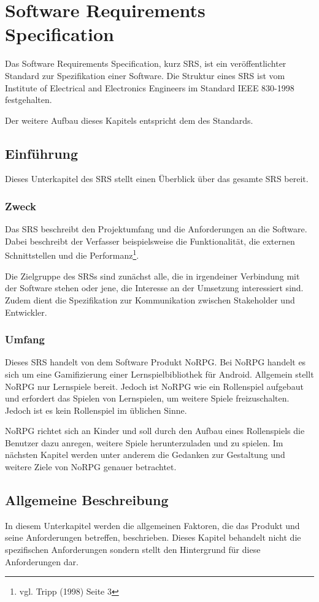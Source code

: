 \chapter{Software Requirements Specification}
	Das Software Requirements Specification, kurz SRS, ist ein veröffentlichter Standard zur Spezifikation einer Software. Die Struktur eines SRS ist vom Institute of Electrical and Electronics Engineers im Standard IEEE 830-1998 festgehalten.
	
	Der weitere Aufbau dieses Kapitels entspricht dem des Standards.
	
\section{Einführung}
	Dieses Unterkapitel des SRS stellt einen Überblick über das gesamte SRS bereit.
	
	\subsection{Zweck}
		Das SRS beschreibt den Projektumfang und die Anforderungen an die Software. Dabei beschreibt der Verfasser beispielsweise die Funktionalität, die externen Schnittstellen und die Performanz\footnote{vgl. Tripp \cite{srsIEEE}(1998) Seite 3}. 
	
		Die Zielgruppe des SRSs sind zunächst alle, die in irgendeiner Verbindung mit der Software stehen oder jene, die Interesse an der Umsetzung interessiert sind. Zudem dient die Spezifikation zur Kommunikation zwischen Stakeholder und Entwickler.
		
	\subsection{Umfang}
		Dieses SRS handelt von dem Software Produkt NoRPG. Bei NoRPG handelt es sich um eine Gamifizierung einer Lernspielbibliothek für Android. Allgemein stellt NoRPG nur Lernspiele bereit. Jedoch ist NoRPG wie ein Rollenspiel aufgebaut und erfordert das Spielen von Lernspielen, um weitere Spiele freizuschalten. Jedoch ist es kein Rollenspiel im üblichen Sinne.
		
		NoRPG richtet sich an Kinder und soll durch den Aufbau eines Rollenspiels die Benutzer dazu anregen, weitere Spiele herunterzuladen und zu spielen. Im nächsten Kapitel werden unter anderem die Gedanken zur Gestaltung und weitere Ziele von NoRPG genauer betrachtet.
		
\section{Allgemeine Beschreibung}
	In diesem Unterkapitel werden die allgemeinen Faktoren, die das Produkt und seine Anforderungen betreffen, beschrieben. Dieses Kapitel behandelt nicht die spezifischen Anforderungen sondern stellt den Hintergrund für diese Anforderungen dar. 

